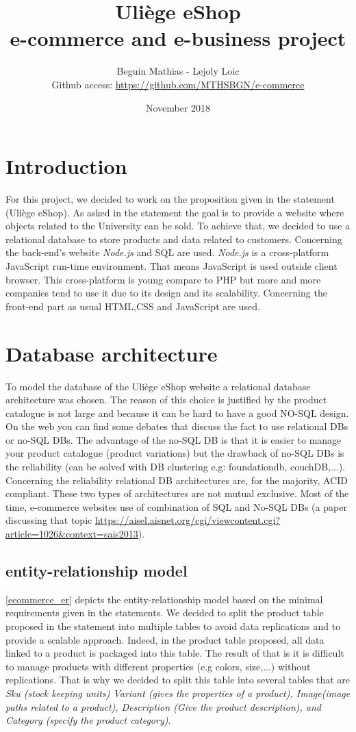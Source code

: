\documentclass{article}
\title{Uliège eShop \\e-commerce and e-business project}
\author{Beguin Mathias - Lejoly Loic \\ Github access: \url{https://github.com/MTHSBGN/e-commerce}}
\date{November 2018}
\begin{document}
\maketitle
\newpage

\section{Introduction}
For this project, we decided to work on the proposition given in the statement (Uliège eShop). As asked in the statement the goal is to provide a website where objects related to the University can be sold. To achieve that, we decided to use a relational database to store products and data related to customers. Concerning the back-end's website \textit{Node.js} and SQL are used. \textit{Node.js} is a cross-platform JavaScript run-time environment. That means JavaScript is used outside client browser. This cross-platform is young compare to PHP but more and more companies tend to use it due to its design and its scalability. Concerning the front-end part as usual HTML,CSS and JavaScript are used.

\section{Database architecture}
To model the database of the Uliège eShop website a relational database architecture was chosen. The reason of this choice is justified by the product catalogue is not large and because it can be hard to have a good NO-SQL design. On the web you can find some debates that discuss the fact to use relational DBs or no-SQL DBs. The advantage of the no-SQL DB is that it is easier to manage your product catalogue (product variations) but the drawback of no-SQL DBs is the reliability (can be solved with DB clustering e.g: foundationdb, couchDB,...). Concerning the reliability relational DB architectures are, for the majority, ACID compliant. These two types of architectures are not mutual exclusive. Most of the time, e-commerce websites use of combination of SQL and No-SQL DBs (a paper discussing that topic \url{https://aisel.aisnet.org/cgi/viewcontent.cgi?article=1026&context=sais2013}).

\subsection{entity-relationship model}
\autoref{ecommerce_er} depicts the entity-relationship model based on the minimal requirements given in the statements. We decided to split the product table proposed in the statement into multiple tables to avoid data replications and to provide a scalable approach. Indeed, in the product table proposed, all data linked to a product is packaged into this table. The result of that is it is difficult to manage products with different properties (e.g colors, size,...) without replications. That is why we decided to split this table into several tables that are \textit{Sku (stock keeping units) Variant (gives the properties of a product), Image(image paths related to a product), Description (Give the product description), and Category (specify the product category)}. \\
\end{document}
